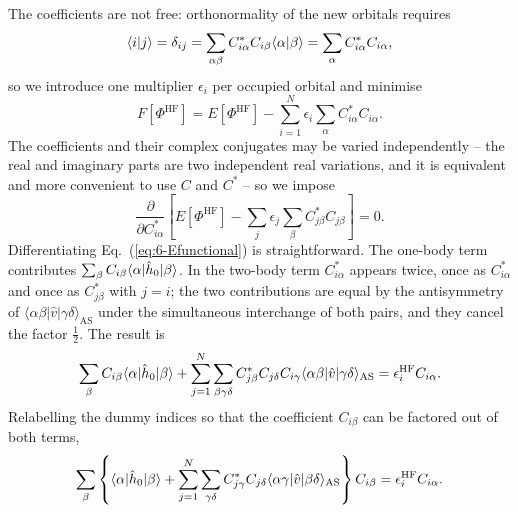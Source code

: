 The coefficients are not free: orthonormality of the new orbitals requires
\begin{equation}
  \langle i \vert j \rangle = \delta_{ij}
  = \sum_{\alpha\beta}C^{*}_{i\alpha}C_{i\beta}\langle \alpha \vert \beta \rangle
  = \sum_{\alpha}C^{*}_{i\alpha}C_{i\alpha},
  \label{eq:6-cconstraint}
\end{equation}
so we introduce one multiplier $\epsilon_i$ per occupied orbital and minimise
\begin{equation}
  F[\Phi^{\mathrm{HF}}] = E[\Phi^{\mathrm{HF}}]
    - \sum_{i=1}^{N}\epsilon_i\sum_{\alpha}C^{*}_{i\alpha}C_{i\alpha}.
  \label{eq:6-lagrangian}
\end{equation}
The coefficients and their complex conjugates may be varied independently --
the real and imaginary parts are two independent real variations, and it is
equivalent and more convenient to use $C$ and $C^{*}$ -- so we impose
\begin{equation}
  \frac{\partial}{\partial C^{*}_{i\alpha}}
  \left[E[\Phi^{\mathrm{HF}}]
    - \sum_{j}\epsilon_j\sum_{\beta}C^{*}_{j\beta}C_{j\beta}\right] = 0 .
  \label{eq:6-variationC}
\end{equation}
Differentiating Eq.~(\ref{eq:6-Efunctional}) is straightforward.  The one-body
term contributes $\sum_{\beta}C_{i\beta}\langle \alpha | \hat{h}_0 | \beta \rangle$.
In the two-body term $C^{*}_{i\alpha}$ appears twice, once as
$C^{*}_{i\alpha}$ and once as $C^{*}_{j\beta}$ with $j=i$; the two
contributions are equal by the antisymmetry of
$\langle\alpha\beta\vert\hat{v}\vert\gamma\delta\rangle_{\mathrm{AS}}$ under
the simultaneous interchange of both pairs, and they cancel the factor
$\tfrac12$.  The result is
\begin{equation}
  \sum_{\beta}C_{i\beta}\langle \alpha | \hat{h}_0 | \beta \rangle
  + \sum_{j=1}^{N}\sum_{\beta\gamma\delta}
      C^{*}_{j\beta}C_{j\delta}C_{i\gamma}
      \langle\alpha\beta\vert\hat{v}\vert\gamma\delta\rangle_{\mathrm{AS}}
  = \epsilon_i^{\mathrm{HF}}C_{i\alpha}.
  \label{eq:6-hfraw}
\end{equation}
Relabelling the dummy indices so that the coefficient $C_{i\beta}$ can be
factored out of both terms,
\begin{equation}
  \sum_{\beta}\left\{\langle \alpha | \hat{h}_0 | \beta \rangle
    + \sum_{j=1}^{N}\sum_{\gamma\delta}C^{*}_{j\gamma}C_{j\delta}
      \langle\alpha\gamma\vert\hat{v}\vert\beta\delta\rangle_{\mathrm{AS}}
    \right\}C_{i\beta} = \epsilon_i^{\mathrm{HF}}C_{i\alpha}.
  \label{eq:6-hfbraced}
\end{equation}

